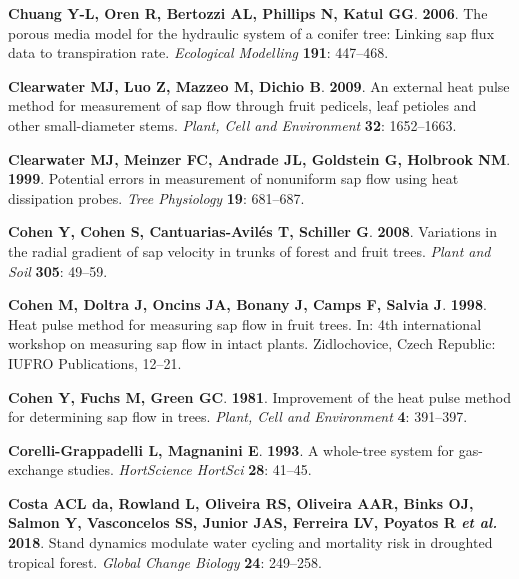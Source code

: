\documentclass[11pt,twoside]{reedthesis}
\begin{document}
\hypertarget{ref-Chuang2006}{}
\textbf{\textnormal{Chuang Y-L}, \textnormal{Oren R},
\textnormal{Bertozzi AL}, \textnormal{Phillips N}, \textnormal{Katul
GG}}. \textbf{2006}. The porous media model for the hydraulic system of
a conifer tree: Linking sap flux data to transpiration rate.
\emph{Ecological Modelling} \textbf{191}: 447--468.

\hypertarget{ref-Clearwater2009}{}
\textbf{\textnormal{Clearwater MJ}, \textnormal{Luo Z},
\textnormal{Mazzeo M}, \textnormal{Dichio B}}. \textbf{2009}. An
external heat pulse method for measurement of sap flow through fruit
pedicels, leaf petioles and other small-diameter stems. \emph{Plant,
Cell and Environment} \textbf{32}: 1652--1663.

\hypertarget{ref-Clearwater1999}{}
\textbf{\textnormal{Clearwater MJ}, \textnormal{Meinzer FC},
\textnormal{Andrade JL}, \textnormal{Goldstein G}, \textnormal{Holbrook
NM}}. \textbf{1999}. Potential errors in measurement of nonuniform sap
flow using heat dissipation probes. \emph{Tree Physiology} \textbf{19}:
681--687.

\hypertarget{ref-Cohen2008}{}
\textbf{\textnormal{Cohen Y}, \textnormal{Cohen S},
\textnormal{Cantuarias-Avilés T}, \textnormal{Schiller G}}.
\textbf{2008}. Variations in the radial gradient of sap velocity in
trunks of forest and fruit trees. \emph{Plant and Soil} \textbf{305}:
49--59.

\hypertarget{ref-Cohen1998}{}
\textbf{\textnormal{Cohen M}, \textnormal{Doltra J}, \textnormal{Oncins
JA}, \textnormal{Bonany J}, \textnormal{Camps F}, \textnormal{Salvia
J}}. \textbf{1998}. Heat pulse method for measuring sap flow in fruit
trees. In: 4th international workshop on measuring sap flow in intact
plants. Zidlochovice, Czech Republic: IUFRO Publications, 12--21.

\hypertarget{ref-Cohen1981}{}
\textbf{\textnormal{Cohen Y}, \textnormal{Fuchs M}, \textnormal{Green
GC}}. \textbf{1981}. Improvement of the heat pulse method for
determining sap flow in trees. \emph{Plant, Cell and Environment}
\textbf{4}: 391--397.

\hypertarget{ref-Corelli1993}{}
\textbf{\textnormal{Corelli-Grappadelli L}, \textnormal{Magnanini E}}.
\textbf{1993}. A whole-tree system for gas-exchange studies.
\emph{HortScience HortSci} \textbf{28}: 41--45.

\hypertarget{ref-daCosta2018}{}
\textbf{\textnormal{Costa ACL da}, \textnormal{Rowland L},
\textnormal{Oliveira RS}, \textnormal{Oliveira AAR}, \textnormal{Binks
OJ}, \textnormal{Salmon Y}, \textnormal{Vasconcelos SS},
\textnormal{Junior JAS}, \textnormal{Ferreira LV}, \textnormal{Poyatos
R} \emph{et al.}} \textbf{2018}. Stand dynamics modulate water cycling
and mortality risk in droughted tropical forest. \emph{Global Change
Biology} \textbf{24}: 249--258.
\end{document}
